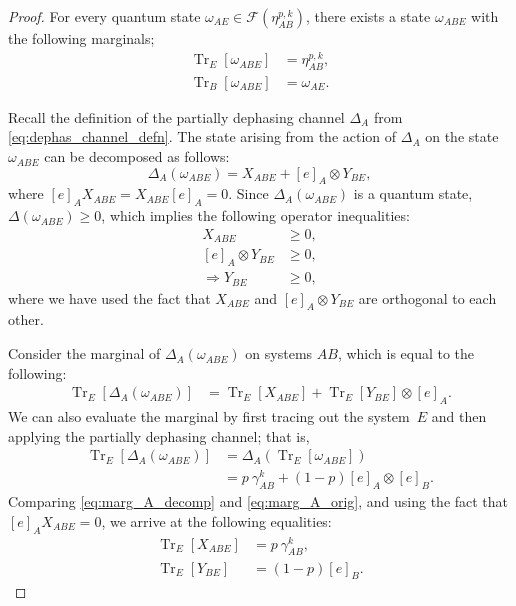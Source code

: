 \documentclass[10pt,a4paper]{amsart}
\begin{document}
\begin{proof}
    For every quantum state $\omega_{AE} \in \mathcal{F}\!\left(\eta^{p,k}_{AB}\right)$, there exists a state $\omega_{ABE}$ with the following marginals;
    \begin{align}
        \operatorname{Tr}_E\!\left[\omega_{ABE}\right] &= \eta^{p,k}_{AB},\\
        \operatorname{Tr}_B\!\left[\omega_{ABE}\right] &= \omega_{AE}.
    \end{align}

    Recall the definition of the partially dephasing channel $\Delta_A$ from \eqref{eq:dephas_channel_defn}. 
    The state arising from the action of  $\Delta_A$ on the state $\omega_{ABE}$ can be decomposed as follows:
    \begin{equation}\label{eq:dephas_decomp}
        \Delta_{A}\!\left(\omega_{ABE}\right) = X_{ABE} + [e]_{A}\otimes Y_{BE},
    \end{equation}
    where $[e]_AX_{ABE} = X_{ABE}[e]_A = 0$. Since $\Delta_{A}\!\left(\omega_{ABE}\right)$ is a quantum state, $\Delta\!\left(\omega_{ABE}\right) \ge 0$, which implies the following operator inequalities:
    \begin{align}
        X_{ABE} &\ge 0,\label{eq:X_pos}\\
        [e]_A\otimes Y_{BE} &\ge 0,\\
        \Rightarrow Y_{BE} &\ge 0\label{eq:Y_pos},
    \end{align}
    where we have used the fact that $X_{ABE}$ and $[e]_A\otimes Y_{BE}$ are orthogonal to each other. 
    
    Consider the marginal of $\Delta_{A }\!\left(\omega_{ABE}\right)$ on systems $AB$, which is equal to the following:
    \begin{align}
        \operatorname{Tr}_{E}\!\left[\Delta_{A}\!\left(\omega_{ABE}\right)\right] &=\operatorname{Tr}_{E}\!\left[X_{ABE}\right] + \operatorname{Tr}_{E}\!\left[Y_{BE}\right]\otimes[e]_A.\label{eq:marg_A_decomp}
    \end{align}
    We can also evaluate the marginal by first tracing out the system~$E$ and then applying the partially dephasing channel; that is,
    \begin{align}
        \operatorname{Tr}_{E}\!\left[\Delta_{A}\!\left(\omega_{ABE}\right)\right] &= \Delta_A\left(\operatorname{Tr}_{E}\!\left[\omega_{ABE}\right]\right)\\
        &= p~\gamma^k_{AB} + (1-p)[e]_A\otimes[e]_B.\label{eq:marg_A_orig}
    \end{align}
    Comparing \eqref{eq:marg_A_decomp} and \eqref{eq:marg_A_orig}, and using the fact that $[e]_AX_{ABE} = 0$, we arrive at the following equalities:
    \begin{align}
        \operatorname{Tr}_{E}\!\left[X_{ABE}\right] &= p~\gamma^k_{AB},\label{eq:X_marg}\\
        \operatorname{Tr}_{E}\!\left[Y_{BE}\right] &= (1-p)[e]_B.\label{eq:Y_marg}
    \end{align}
    

\end{proof}
\end{document}
